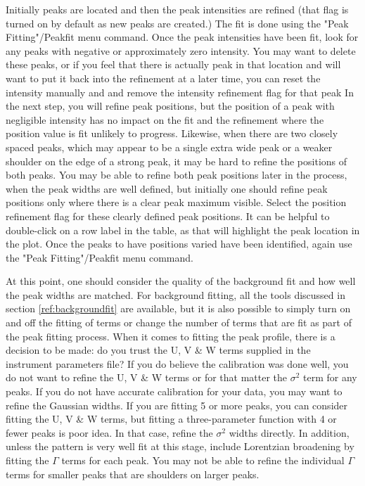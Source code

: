 Initially peaks are located and then the peak intensities are refined (that flag is turned on by default as new peaks are created.) The fit is done using the "Peak Fitting"/Peakfit menu command. Once the peak intensities have been fit, look for any peaks with negative or approximately zero intensity. You may want to delete these peaks, or if you feel that there is actually peak in that location and will want to put it back into the refinement at a later time, you can reset the intensity manually and and remove the intensity refinement flag for that peak In the next step, you will refine peak positions, but the position of a peak with negligible intensity has no impact on the fit and the refinement where the position value is fit unlikely to progress. Likewise, when there are two closely spaced peaks, which may appear to be a single extra wide peak or a weaker shoulder on the edge of a strong peak, it may be hard to refine the positions of both peaks. You may be able to refine both peak positions later in the process, when the peak widths are well defined, but initially one should refine peak positions only where there is a clear peak maximum visible. Select the position refinement flag for these clearly defined peak positions. It can be helpful to double-click on a row label in the table, as that will highlight the peak location in the plot. Once the peaks to have positions varied have been identified, again use the "Peak Fitting"/Peakfit menu command. 

At this point, one should consider the quality of the background fit and how well the peak widths are matched. For background fitting, all the tools discussed in section \ref{ref:backgroundfit} are available, but it is also possible to simply turn on and off the fitting of terms or change the number of terms that are fit as part of the peak fitting process. When it comes to fitting the peak profile, there is a decision to be made: do you trust the U, V \& W terms supplied in the instrument parameters file? If you do believe the calibration was done well, you do not want to refine the U, V \& W terms or for that matter the $\sigma^2$ term for any peaks. If you do not have accurate calibration for your data, you may want to refine the Gaussian widths. If you are fitting 5 or more peaks, you can consider fitting the  U, V \& W terms, but fitting a three-parameter function with 4 or fewer peaks is poor idea. In that case, refine the $\sigma^2$ widths directly. In addition, unless the pattern is very well fit at this stage, include Lorentzian broadening by fitting the $\Gamma$ terms for each peak. You may not be able to refine the individual $\Gamma$ terms for smaller peaks that are shoulders on larger peaks. 

